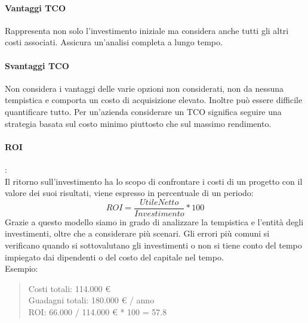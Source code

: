 \documentclass{article}
\begin{document}
		\paragraph{Vantaggi TCO}
		Rappresenta non solo l'investimento iniziale ma considera anche tutti gli altri costi associati. Assicura un'analisi completa a lungo tempo.
		
		\paragraph{Svantaggi TCO}
		Non considera i vantaggi delle varie opzioni non considerati, non da nessuna tempistica e comporta un costo di acquisizione elevato. Inoltre può essere difficile quantificare tutto.
		Per un'azienda considerare un TCO significa seguire una strategia basata sul costo minimo piuttosto che sul massimo rendimento.
		
		\paragraph{ROI}:\mbox{}\\
		Il ritorno sull'investimento ha lo scopo di confrontare i costi di un progetto con il valore dei suoi risultati, viene espresso in percentuale di un periodo: $$ ROI =\frac{Utile Netto}{ Investimento} * 100 $$
		Grazie a questo modello siamo in grado di analizzare la tempistica e l'entità degli investimenti, oltre che a considerare più scenari.
		Gli errori più comuni si verificano quando si sottovalutano gli investimenti o non si tiene conto del tempo impiegato dai dipendenti o del costo del capitale nel tempo.\\ 
		
		Esempio:\\
		\begin{quote}
		Costi totali: 114.000 €\\
		Guadagni totali: 180.000 € / anno\\
		ROI: 66.000 / 114.000 € * 100 = 57.8%
		\end{quote}
		
		\newpage
\end{document}
